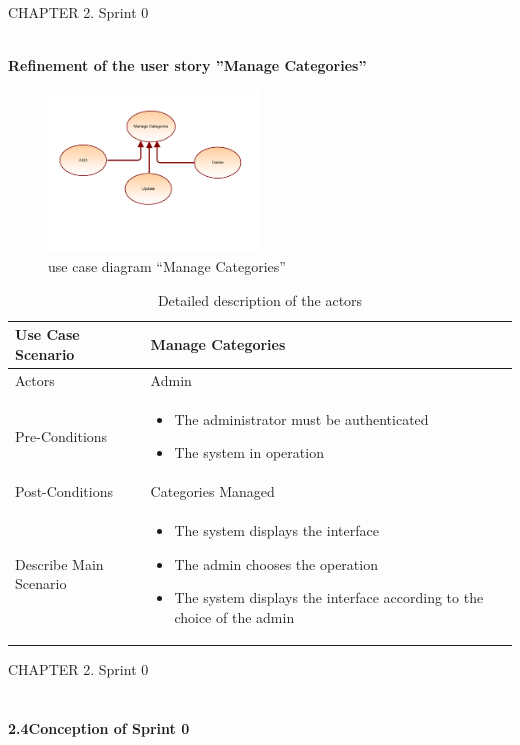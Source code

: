 \documentclass{article}
\begin{document}
{{\newpage
\noindent
CHAPTER 2.  Sprint 0 \\
\underline{\hspace{\textwidth}} \vspace{0.2cm}\\
{\large \textbf{Refinement of the user story ”Manage Categories”}
\begin{figure}[htbp]
    \centering
    \includegraphics[width=0.5\textwidth]{Manage}
    \caption{use case diagram “Manage Categories”}
    \label{fig:design2}
\end{figure}
\begin{table}[h]
    \centering
    \begin{tabularx}{\textwidth}{X|X}
        \toprule
        Use Case Scenario & Manage Categories \\
        \midrule
        Actors & Admin \\
        \midrule
        Pre-Conditions & \begin{itemize}[label=$\bullet$]
            \item The administrator must be authenticated
            \item The system in operation
        \end{itemize} \\
        \midrule
        Post-Conditions & Categories Managed  \\
        \midrule
        Describe Main Scenario &  \begin{itemize}[label=$\bullet$]
            \item The system displays the interface
            \item The admin chooses the operation
            \item The system displays the interface according to the choice of the admin
        \end{itemize} \\
        \bottomrule
    \end{tabularx}
    \caption{Detailed description of the actors}
    \label{tab:actors_roles}
\end{table}
\newpage
\noindent
CHAPTER 2.  Sprint 0 \\
\underline{\hspace{\textwidth}} \vspace{0.2cm}\\
\\{\Large \textbf{2.4\hspace{1em}Conception of Sprint 0}}\vspace{0.2cm}

}}}
\end{document}

